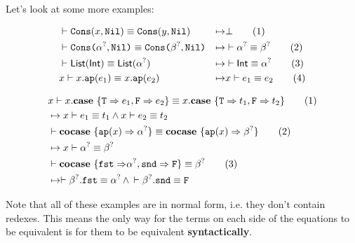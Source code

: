 \documentclass[twoside,12pt,a4paper]{article}
\begin{document}
Let's look at some more examples:
\begin{example}
    \begin{align*}
    &\vdash \mathtt{Cons(}x, \mathtt{Nil}\mathtt{)} \equiv \mathtt{Cons(}y, \mathtt{Nil}\mathtt{)}&\mapsto& \bot
    \tag{1}\\
    &\vdash \texttt{Cons(}\alpha^?, \texttt{Nil)}\equiv\texttt{Cons(}\beta^?, \texttt{Nil)}
    &\mapsto&\vdash \alpha^?\equiv \beta^?
    \tag{2}\\
    &\vdash \mathsf{List(Int)}\equiv \mathsf{List(\alpha^?)}
    &\mapsto& \vdash \mathsf{Int}\equiv \alpha^?
    \tag{3}\\
    &x \vdash x.\texttt{ap}(e_1)\equiv x.\texttt{ap}(e_2) &\mapsto& x\vdash e_1\equiv e_2 
    \tag{4}
    \end{align*}
\end{example}

\begin{example}
    \begin{align*}
    &x\vdash x.\textbf{case}\ \{\texttt{T} \Rightarrow e_1, \texttt{F} \Rightarrow e_2\} \equiv x.\textbf{case}\ \{\texttt{T} \Rightarrow t_1, \texttt{F} \Rightarrow t_2\}\tag{1}
    \\ &\mapsto x\vdash  e_1 \equiv t_1\wedge x\vdash e_2\equiv t_2\\
    &\vdash \textbf{cocase}\ \{\texttt{ap}(x)\Rightarrow \alpha^?\} \equiv \textbf{cocase}\ \{\texttt{ap}(x)\Rightarrow\beta^?\} \tag{2}
    \\ &\mapsto x\vdash \alpha^? \equiv \beta^?\\
    &\vdash\textbf{cocase}\ \{\mathtt{fst \Rightarrow} \alpha^?, \mathtt{snd\Rightarrow F}\}\equiv \beta^? \tag{3}
    \\ &\mapsto \vdash \beta^?.\mathtt{fst} \equiv\alpha^?\, \wedge \,\vdash \mathtt{\beta^?.snd\equiv F}
    \end{align*}
\end{example}
Note that all of these examples are in normal form, i.e. they don't contain redexes.
This means the only way for the terms on each side of the equations to be equivalent
is for them to be equivalent \textbf{syntactically}. 
\end{document}
